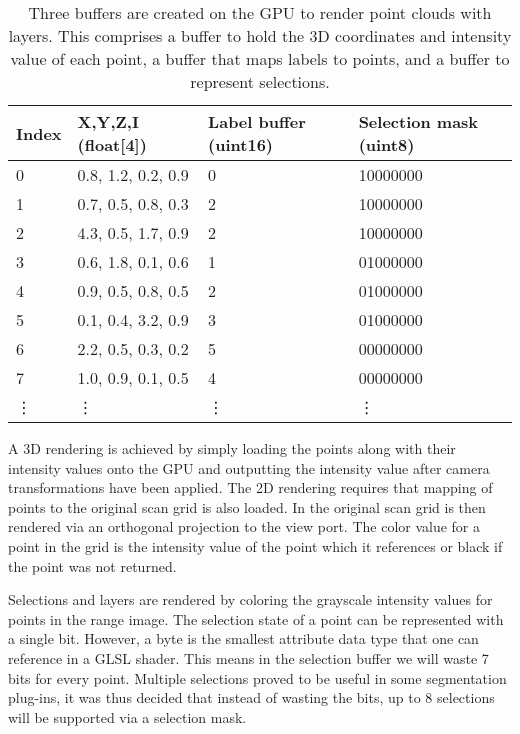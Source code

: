 \begin{table}[ht]
	\begin{center}
	\begin{tabular}{|l|l|l|l|}
	\hline
	Index & X,Y,Z,I (float{[}4{]}) & Label buffer (uint16) & Selection mask (uint8)\\
	\hline
	0     & 0.8, 1.2, 0.2, 0.9 & 0                     & 10000000               \\
	1     & 0.7, 0.5, 0.8, 0.3 & 2                     & 10000000               \\
	2     & 4.3, 0.5, 1.7, 0.9 & 2                     & 10000000               \\
	3     & 0.6, 1.8, 0.1, 0.6 & 1                     & 01000000               \\
	4     & 0.9, 0.5, 0.8, 0.5 & 2                     & 01000000               \\
	5     & 0.1, 0.4, 3.2, 0.9 & 3                     & 01000000               \\
	6     & 2.2, 0.5, 0.3, 0.2 & 5                     & 00000000               \\
	7     & 1.0, 0.9, 0.1, 0.5 & 4                     & 00000000               \\
	\vdots     & \vdots & \vdots  & \vdots             \\
	\hline
	\end{tabular}
	\end{center}
	\caption[GPU buffer layout]{Three buffers are created on the GPU to render point clouds with layers. This comprises a buffer to hold the 3D coordinates and intensity value of each point, a buffer that maps labels to points, and a buffer to represent selections.}
	\label{table:gpulayout}
\end{table}


A 3D rendering is achieved by simply loading the points along with their intensity values onto the GPU and outputting the intensity value after camera transformations have been applied. The 2D rendering requires that mapping of points to the original scan grid is also loaded. In the original scan grid is then rendered via an orthogonal projection to the view port. The color value for a point in the grid is the intensity value of the point which it references or black if the point was not returned. 

Selections and layers are rendered by coloring the grayscale intensity values for points in the range image. The selection state of a point can be represented with a single bit. However, a byte is the smallest attribute data type that one can reference in a GLSL shader. This means in the selection buffer we will waste 7 bits for every point. Multiple selections proved to be useful in some segmentation plug-ins, it was thus decided that instead of wasting the bits, up to 8 selections will be supported via a selection mask.

